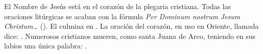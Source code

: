  El Nombre de Jesús está en el corazón de la plegaria cristiana. Todas las oraciones litúrgicas se acaban con la fórmula \emph{Per Dominum nostrum Jesum Christum\ldots{}} (). El  culmina en . La oración del corazón, en uso en Oriente, llamada  dice: . Numerosos cristianos mueren, como santa Juana de Arco, teniendo en sus labios una única palabra: .